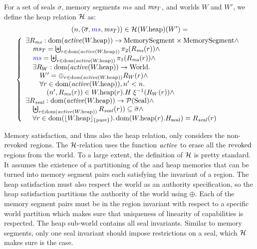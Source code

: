 \begin{jversion}
\begin{definition}
\label{def:heap-rel}
For a set of seals $\overline{\sigma}$, memory segments $ms$ and $\mathit{ms}_T$, and worlds $W$ and $W'$, we define the heap relation $\mathcal{H}$ as:
\begin{multline*}
    \npair{(\overline{\sigma},\src{ms},\ms_T)} \in \lrheap(\pwheap)(W') =\\
    \left\{
      \begin{array}{l}
        \exists R_\ms : \dom(\activeReg{\pwheap}) \fun \MemSeg \times \MemSeg \wedge \\
        \quad \ms_T = \biguplus_{r \in \dom(\activeReg{\pwheap})} \pi_2(R_\ms(r)) \wedge \\
        \quad \src{\ms} = \biguplus_{r \in \dom(\activeReg{\pwheap})} \pi_1(R_\ms(r)) \wedge \\
        \quad \exists R_W : \dom(\activeReg{\pwheap}) \fun \World\ldotp\\
        \qquad W' = \oplus_{r \in \dom(\activeReg{\pwheap})} R_W(r) \wedge\\
        \qquad \forall r \in \dom(\activeReg{\pwheap}), n' < n \ldotp \\
        \qquad \quad \npair[n']{R_\ms(r)} \in  \pwheap(r).H \; \xi^{-1}(R_W(r)) \wedge\\
        \exists R_\var{seal} : \dom(\activeReg{\pwheap}) \fun \powerset{\Seal} \wedge\\
        \quad \biguplus_{r \in \dom(\activeReg{\pwheap})} R_\var{seal}(r)) \subseteq \overline{\sigma} \wedge\\
        \quad \forall r \in \dom(\erase{\pwheap}{\pure})\ldotp \dom(\pwheap(r).H_{\mathrm{seal}}) = R_\var{seal}(r)
      \end{array}
    \right.
\end{multline*}
\end{definition}

Memory satisfaction, and thus also the heap relation, only considers the non-$\mathrm{revoked}$ regions.
The $\mathcal{H}$-relation uses the function $\activeReg{}$ to erase all the $\mathrm{revoked}$ regions from the world.
To a large extent, the definition of $\mathcal{H}$ is pretty standard.
It assumes the existence of a partitioning of the \trgcm{} and \srccm{} heap memories that can be turned into memory segment pairs each satisfying the invariant of a region.
The heap satisfaction must also respect the world as an authority specification, so the heap satisfaction partitions the authority of the world using $\oplus$.
Each of the memory segment pairs must be in the region invariant with respect to a specific world partition which makes sure that uniqueness of linearity of capabilities is respected.
The heap sub-world contains all seal invariants.
Similar to memory segments, only one seal invariant should impose restrictions on a seal, which $\mathcal{H}$ makes sure is the case.


\end{jversion}
